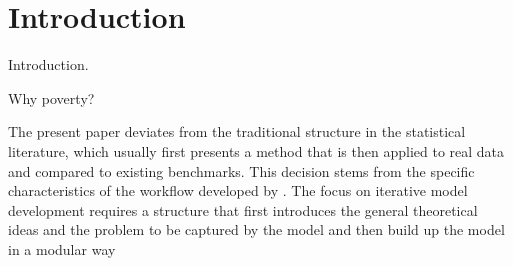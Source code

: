 \chapter{Introduction}

Introduction.

Why poverty?

The present paper deviates from the traditional structure in the statistical literature, which usually first presents a method that is then applied to real data and compared to existing benchmarks.
This decision stems from the specific characteristics of the workflow developed by \cite{gelman_bayesian_2020}.
The focus on iterative model development requires a structure that first introduces the general theoretical ideas and the problem to be captured by the model and then build up the model in a modular way




